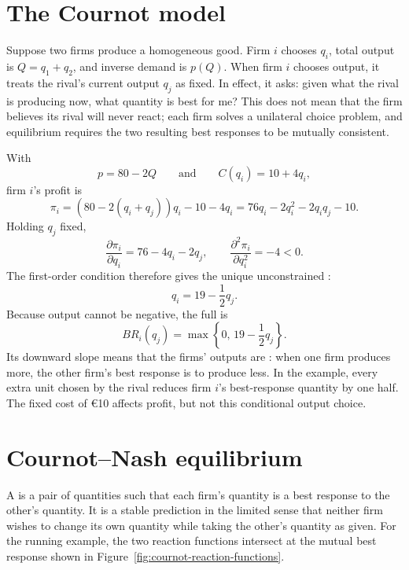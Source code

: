 \section{The Cournot model}

Suppose two firms produce a homogeneous good. Firm $i$ chooses $q_i$, total
output is $Q=q_1+q_2$, and inverse demand is $p(Q)$. When firm $i$ chooses
output, it treats the rival's current output $q_j$ as fixed. In effect, it
asks: given what the rival is producing now, what quantity is best for me?
This does not mean that the firm believes its rival will never react; each
firm solves a unilateral choice problem, and equilibrium requires the two
resulting best responses to be mutually consistent.

With
\[
p=80-2Q
\qquad\text{and}\qquad
C(q_i)=10+4q_i,
\]
firm $i$'s profit is
\[
\pi_i
=(80-2(q_i+q_j))q_i-10-4q_i
=76q_i-2q_i^2-2q_iq_j-10.
\]
Holding $q_j$ fixed,
\[
\frac{\partial\pi_i}{\partial q_i}
=76-4q_i-2q_j,
\qquad
\frac{\partial^2\pi_i}{\partial q_i^2}=-4<0.
\]
The first-order condition therefore gives the unique unconstrained
:
\[
q_i=19-\frac{1}{2}q_j.
\]
Because output cannot be negative, the full  is
\[
BR_i(q_j)=\max\left\{0,\,
19-\frac{1}{2}q_j\right\}.
\]
Its downward slope means that the firms' outputs are
: when one firm produces more, the other
firm's best response is to produce less. In the example, every extra unit
chosen by the rival reduces firm $i$'s best-response quantity by one half.
The fixed cost of \euro10 affects profit, but not this conditional output
choice.

\section{Cournot--Nash equilibrium}

A  is a pair of quantities such that each
firm's quantity is a best response to the other's quantity. It is a stable
prediction in the limited sense that neither firm wishes to change its own
quantity while taking the other's quantity as given. For the running example,
the two reaction functions intersect at the mutual best response shown in
Figure~\ref{fig:cournot-reaction-functions}.

